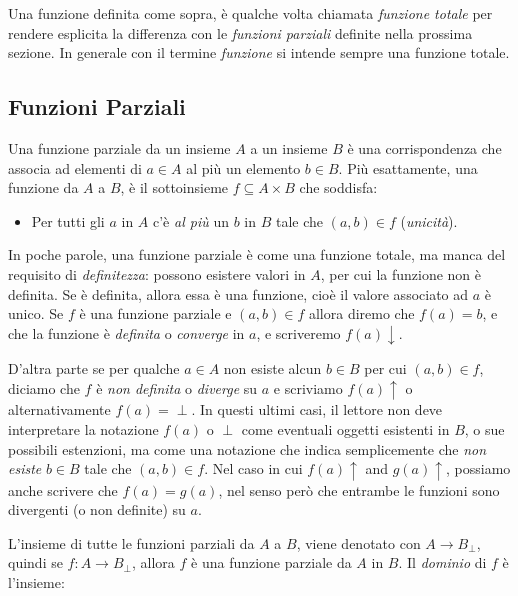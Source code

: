 Una funzione definita come sopra, è qualche volta chiamata
\emph{funzione totale} per rendere esplicita la differenza con le
\emph{funzioni parziali} definite nella prossima sezione.  In generale
con il termine \emph{funzione} si intende sempre una funzione totale.

\subsection{Funzioni Parziali}\label{sec:fun}

\begin{defn}
  Una funzione parziale da un insieme $A$ a un insieme $B$ è una
  corrispondenza che associa ad elementi di $a \in A$ al più un
  elemento $b \in B$.  Più esattamente, una funzione da $A$ a $B$, è
  il sottoinsieme $f \subseteq A\times B$ che soddisfa:
\begin{itemize}
\item Per tutti gli $a$ in $A$ c'è \emph{al più} un $b$ in $B$ tale
  che $(a,b) \in f$ (\emph{unicità}).
\end{itemize}
\end{defn}

In poche parole, una funzione parziale è come una funzione totale, ma
manca del requisito di \emph{definitezza}: possono esistere valori in
$A$, per cui la funzione non è definita. Se è definita, allora essa è
una funzione, cioè il valore associato ad $a$ è unico. Se $f$ è una
funzione parziale e $(a,b) \in f$ allora diremo che $f(a) = b$, e che
la funzione è \emph{definita} o \emph{converge} in $a$, e scriveremo
$f(a)\downarrow$.

D'altra parte se per qualche $a \in A$ non esiste alcun $b \in B$ per
cui $(a,b) \in f$, diciamo che $f$ è \emph{non definita} o
\emph{diverge} su $a$ e scriviamo $f(a)\uparrow$ o alternativamente
$f(a) = \perp$. In questi ultimi casi, il lettore non deve
interpretare la notazione $f(a)$ o $\perp$ come eventuali oggetti
esistenti in $B$, o sue possibili estenzioni, ma come una notazione
che indica semplicemente che \emph{non esiste} $b \in B$ tale che
$(a,b) \in f$. Nel caso in cui $f(a)\uparrow$ and $g(a)\uparrow$,
possiamo anche scrivere che $f(a) = g(a)$, nel senso però che entrambe
le funzioni sono divergenti (o non definite) su $a$.

L'insieme di tutte le funzioni parziali da $A$ a $B$, viene denotato
con $A \rightarrow B_\perp$, quindi se $f: A \rightarrow B_\perp$,
allora $f$ è una funzione parziale da $A$ in $B$. Il \emph{dominio} di
$f$ è l'insieme:

